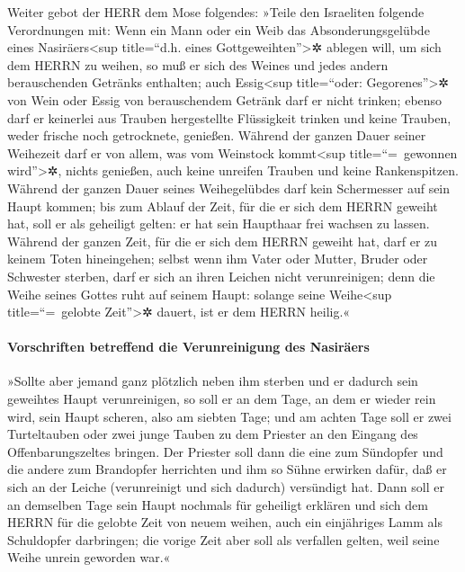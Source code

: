 Weiter gebot der HERR dem Mose folgendes:
»Teile den Israeliten folgende Verordnungen mit: Wenn ein
Mann oder ein Weib das Absonderungsgelübde eines Nasiräers\textless sup
title=``d.h. eines Gottgeweihten''\textgreater✲ ablegen will, um sich
dem HERRN zu weihen, so muß er sich des Weines und jedes
andern berauschenden Getränks enthalten; auch Essig\textless sup
title=``oder: Gegorenes''\textgreater✲ von Wein oder Essig von
berauschendem Getränk darf er nicht trinken; ebenso darf er keinerlei
aus Trauben hergestellte Flüssigkeit trinken und keine Trauben, weder
frische noch getrocknete, genießen. Während der ganzen
Dauer seiner Weihezeit darf er von allem, was vom Weinstock
kommt\textless sup title=``=~gewonnen wird''\textgreater✲, nichts
genießen, auch keine unreifen Trauben und keine Rankenspitzen.
Während der ganzen Dauer seines Weihegelübdes darf kein
Schermesser auf sein Haupt kommen; bis zum Ablauf der Zeit, für die er
sich dem HERRN geweiht hat, soll er als geheiligt gelten: er hat sein
Haupthaar frei wachsen zu lassen. Während der ganzen Zeit,
für die er sich dem HERRN geweiht hat, darf er zu keinem Toten
hineingehen; selbst wenn ihm Vater oder Mutter, Bruder
oder Schwester sterben, darf er sich an ihren Leichen nicht
verunreinigen; denn die Weihe seines Gottes ruht auf seinem Haupt:
solange seine Weihe\textless sup title=``=~gelobte
Zeit''\textgreater✲ dauert, ist er dem HERRN heilig.«

\hypertarget{vorschriften-betreffend-die-verunreinigung-des-nasiruxe4ers}{%
\paragraph{Vorschriften betreffend die Verunreinigung des
Nasiräers}\label{vorschriften-betreffend-die-verunreinigung-des-nasiruxe4ers}}

»Sollte aber jemand ganz plötzlich neben ihm sterben und
er dadurch sein geweihtes Haupt verunreinigen, so soll er an dem Tage,
an dem er wieder rein wird, sein Haupt scheren, also am siebten Tage;
und am achten Tage soll er zwei Turteltauben oder zwei
junge Tauben zu dem Priester an den Eingang des Offenbarungszeltes
bringen. Der Priester soll dann die eine zum Sündopfer
und die andere zum Brandopfer herrichten und ihm so Sühne erwirken
dafür, daß er sich an der Leiche (verunreinigt und sich dadurch)
versündigt hat. Dann soll er an demselben Tage sein Haupt nochmals für
geheiligt erklären und sich dem HERRN für die gelobte
Zeit von neuem weihen, auch ein einjähriges Lamm als Schuldopfer
darbringen; die vorige Zeit aber soll als verfallen gelten, weil seine
Weihe unrein geworden war.«

